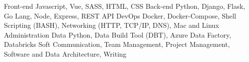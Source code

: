 
\begin{cvskills}
  \cvskill%
    {Front-end}
    {Javascript, Vue, SASS, HTML, CSS}
  \cvskill%
    {Back-end}
    {Python, Django, Flask, Go Lang, Node, Express, REST API}
  \cvskill%
    {DevOps}
    {Docker, Docker-Compose, Shell Scripting (BASH), Networking (HTTP, TCP/IP, DNS), Mac and Linux Administration}
  \cvskill%
    {Data}
    {Python, Data Build Tool (DBT), Azure Data Factory, Databricks}
  \cvskill%
    {Soft}
    {Communication, Team Management, Project Management, Software and Data Architecture, Writing}
\end{cvskills}
